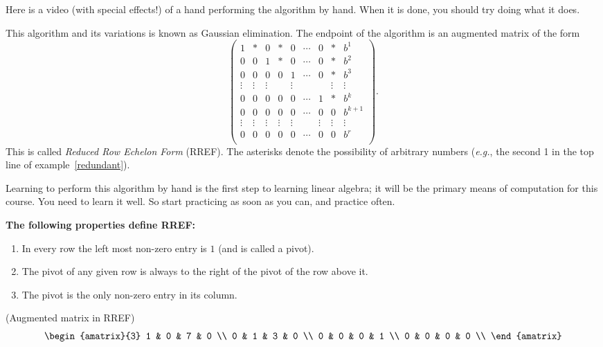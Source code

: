 Here is a video (with special effects!) of a hand performing the algorithm by hand. When it is done, you should try doing what it does.

\noindent
This algorithm and its variations is known as Gaussian elimination. The endpoint of the algorithm is  an augmented matrix of the form \label{Reduced row echelon form} 
\[\left(
\begin{array}{cccccccc|c}
1       	& * & 0		& * & 0		& \cdots& 0	&*	& b^1 \\[.5mm] 
0	        & 0 & 1		& * & 0		& \cdots& 0	&*	& b^2 \\[.5mm]
0		& 0& 0		& 0 & 1		& \cdots& 0	&*	& b^3 \\[.5mm]  
\vdots  	& \vdots& \vdots	&   & \vdots &	& 	& 
\vdots			& \vdots \\[2mm]  
0		& 0&	0		&  0& 0			&  \cdots   & 1		&*	& b^k \\[.5mm]  
0		& 0 & 0		& 0 & 0		& \cdots& 0 	&0	& b^{k+1} \\[.5mm] 
\vdots  	& \vdots & \vdots	&  \vdots & \vdots	& 	& \vdots	&\vdots	& \vdots \\[.5mm]  
0		&  0 & 0		& 0 & 0		& \cdots& 0		 & 0& b^r \\ 
\end{array}\!\right).\]
This is called 
\emph{Reduced Row Echelon Form} (RREF).
The asterisks denote the possibility of arbitrary numbers ({\itshape e.g.}, the second 1 in the top line of example~\ref{redundant}).

Learning to perform this algorithm by hand is the first step to learning linear algebra; it will be the primary means of computation for this course. You need to learn it well. So start practicing as soon as you can, and practice often. 


\newpage
\begin{center}
\Large{{\bfseries The following properties define RREF:}}
\end{center}
\begin{enumerate}
\item  In every row  the left most non-zero entry is  $1$ (and is called a pivot).
\item The pivot of any given row is always to the right of the pivot of the row above it.
\item The pivot is the only non-zero entry in its column.
\end{enumerate}
\begin{example}\label{augrref} (Augmented matrix in RREF)
\[
\begin{amatrix}{3} 
1 & 0 & 7 & 0 \\ 
0 & 1 & 3 & 0 \\
0 & 0 & 0 & 1 \\
0 & 0 & 0 & 0 \\
\end{amatrix}
\]
\end{example}

